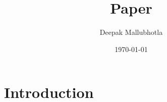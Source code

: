 \documentclass{article}
\title{Paper}
\author{Deepak Mallubhotla}
\date{\today}
\begin{document}
\maketitle

\section{Introduction \label{sec:intro}}

\printbibliography
\end{document}
